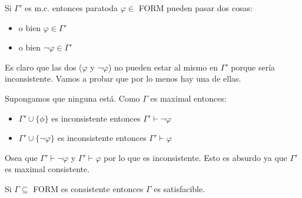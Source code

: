 \begin{proposicion}
	Si $\Gamma'$ es m.c. entonces paratoda $\varphi\in$ FORM pueden pasar dos cosas:
	\begin{itemize}
		\item o bien $\varphi\in\Gamma'$
		\item o bien $\lnot\varphi\in\Gamma'$
	\end{itemize}
\end{proposicion}

\begin{demo}
	Es claro que las dos ($\varphi$ y $\lnot\varphi$) no pueden estar al mismo en $\Gamma'$ porque sería inconsistente. Vamos a probar que por lo menos hay una de ellas.
	
	Supongamos que ninguna está. Como $\Gamma$ es maximal entonces:
	\begin{itemize}
		\item $\Gamma'\cup\{\phi\}$ es inconsistente entonces $\Gamma'\vdash\lnot\varphi$
		\item $\Gamma'\cup\{\lnot\varphi\}$ es inconsistente entonces $\Gamma'\vdash\varphi$
	\end{itemize}
	Osea que $\Gamma'\vdash\lnot\varphi$ y $\Gamma'\vdash\varphi$ por lo que es inconsistente. Esto es absurdo ya que $\Gamma'$ es maximal consistente.
\end{demo}

\begin{teorema}
	Si $\Gamma\subseteq$ FORM es consistente entonces $\Gamma$ es satisfacible.
\end{teorema}

